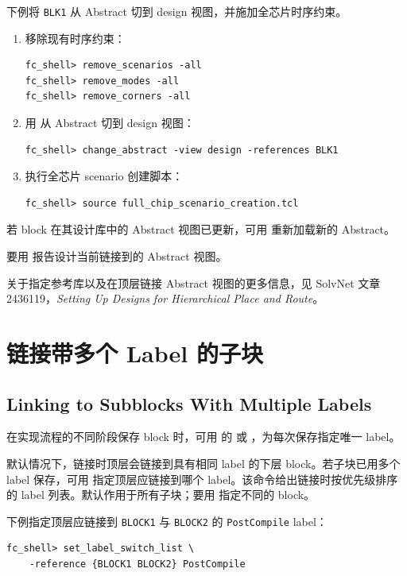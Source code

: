 下例将 \texttt{BLK1} 从 Abstract 切到 design 视图，并施加全芯片时序约束。
\begin{enumerate}
  \item 移除现有时序约束：
\begin{lstlisting}
fc_shell> remove_scenarios -all
fc_shell> remove_modes -all
fc_shell> remove_corners -all
\end{lstlisting}
  \item 用  从 Abstract 切到 design 视图：
\begin{lstlisting}
fc_shell> change_abstract -view design -references BLK1
\end{lstlisting}
  \item 执行全芯片 scenario 创建脚本：
\begin{lstlisting}
fc_shell> source full_chip_scenario_creation.tcl
\end{lstlisting}
\end{enumerate}

若 block 在其设计库中的 Abstract 视图已更新，可用  重新加载新的 Abstract。

要用  报告设计当前链接到的 Abstract 视图。

关于指定参考库以及在顶层链接 Abstract 视图的更多信息，见 SolvNet 文章 2436119，\textit{Setting Up Designs for Hierarchical Place and Route}。

\section{链接带多个 Label 的子块}
\subsection*{Linking to Subblocks With Multiple Labels}

在实现流程的不同阶段保存 block 时，可用  的  或 ，为每次保存指定唯一 label。

默认情况下，链接时顶层会链接到具有相同 label 的下层 block。若子块已用多个 label 保存，可用  指定顶层应链接到哪个 label。该命令给出链接时按优先级排序的 label 列表。默认作用于所有子块；要用  指定不同的 block。

下例指定顶层应链接到 \texttt{BLOCK1} 与 \texttt{BLOCK2} 的 \texttt{PostCompile} label：
\begin{lstlisting}
fc_shell> set_label_switch_list \
    -reference {BLOCK1 BLOCK2} PostCompile
\end{lstlisting}

